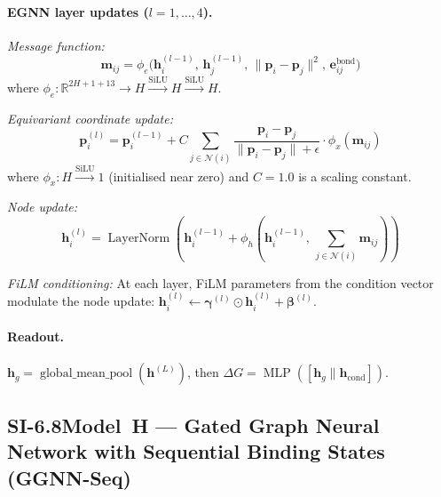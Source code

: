\documentclass[11pt]{article}
\begin{document}
\paragraph{EGNN layer updates ($l = 1, \ldots, 4$).}

\textit{Message function:}
\begin{equation}
  \mathbf{m}_{ij} = \phi_e\!\bigl(
    \mathbf{h}_i^{(l-1)},\, \mathbf{h}_j^{(l-1)},\,
    \|\mathbf{p}_i - \mathbf{p}_j\|^2,\,
    \mathbf{e}_{ij}^{\mathrm{bond}}
  \bigr)
  \label{eq:egnn_msg}
\end{equation}
where $\phi_e: \mathbb{R}^{2H + 1 + 13} \to H
\xrightarrow{\mathrm{SiLU}} H \xrightarrow{\mathrm{SiLU}} H$.

\textit{Equivariant coordinate update:}
\begin{equation}
  \mathbf{p}_i^{(l)} = \mathbf{p}_i^{(l-1)}
  + C \sum_{j \in \mathcal{N}(i)}
  \frac{\mathbf{p}_i - \mathbf{p}_j}
       {\|\mathbf{p}_i - \mathbf{p}_j\| + \epsilon}
  \cdot \phi_x(\mathbf{m}_{ij})
  \label{eq:egnn_coord}
\end{equation}
where $\phi_x: H \xrightarrow{\mathrm{SiLU}} 1$ (initialised near zero)
and $C = 1.0$ is a scaling constant.

\textit{Node update:}
\begin{equation}
  \mathbf{h}_i^{(l)} = \operatorname{LayerNorm}\!\left(
    \mathbf{h}_i^{(l-1)} + \phi_h\!\left(
      \mathbf{h}_i^{(l-1)},\,
      \sum_{j \in \mathcal{N}(i)} \mathbf{m}_{ij}
    \right)
  \right)
  \label{eq:egnn_node}
\end{equation}

\textit{FiLM conditioning:}
At each layer, FiLM parameters from the condition vector modulate
the node update:
$\mathbf{h}_i^{(l)} \leftarrow \boldsymbol{\gamma}^{(l)} \odot
\mathbf{h}_i^{(l)} + \boldsymbol{\beta}^{(l)}$.

\paragraph{Readout.}
$\mathbf{h}_g = \operatorname{global\_mean\_pool}(\mathbf{h}^{(L)})$,
then $\Delta G = \operatorname{MLP}([\mathbf{h}_g \| \mathbf{h}_{\mathrm{cond}}])$.

\subsection*{SI-6.8\quad Model~H --- Gated Graph Neural Network with Sequential Binding States (GGNN-Seq)}
\label{si:model_h}
\end{document}
